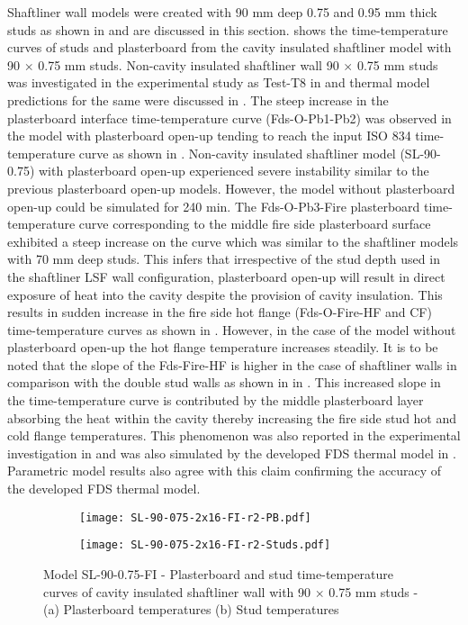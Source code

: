 Shaftliner wall models were created with 90 mm deep 0.75 and 0.95 mm thick studs as shown in  and are discussed in this section.  shows the time-temperature curves of studs and plasterboard from the cavity insulated shaftliner model with 90 $\times$ 0.75 mm studs. Non-cavity insulated shaftliner wall 90 $\times$ 0.75 mm studs was investigated in the experimental study as Test-T8 in  and thermal model predictions for the same were discussed in . The steep increase in the plasterboard interface time-temperature curve (Fds-O-Pb1-Pb2) was observed in the model with plasterboard open-up tending to reach the input ISO 834 time-temperature curve as shown in . Non-cavity insulated shaftliner model (SL-90-0.75) with plasterboard open-up experienced severe instability similar to the previous plasterboard open-up models. However, the model without plasterboard open-up could be simulated for 240 min. The Fds-O-Pb3-Fire plasterboard time-temperature curve corresponding to the middle fire side plasterboard surface exhibited a steep increase on the curve which was similar to the shaftliner models with 70 mm deep studs. This infers that irrespective of the stud depth used in the shaftliner LSF wall configuration, plasterboard open-up will result in direct exposure of heat into the cavity despite the provision of cavity insulation. This results in sudden increase in the fire side hot flange (Fds-O-Fire-HF and CF) time-temperature curves as shown in . However, in the case of the model without plasterboard open-up the hot flange temperature increases steadily. It is to be noted that the slope of the Fds-Fire-HF is higher in the case of shaftliner walls in comparison with the double stud walls as shown in  in . This increased slope in the time-temperature curve is contributed by the middle plasterboard layer absorbing the heat within the cavity thereby increasing the fire side stud hot and cold flange temperatures. This phenomenon was also reported in the experimental investigation in  and was also simulated by the developed FDS thermal model in . Parametric model results also agree with this claim confirming the accuracy of the developed FDS thermal model.  
\begin{figure}[!htbp]
	\centering
	\begin{subfigure}[b]{0.6\textwidth}
		\centering
		\texttt{[image: SL-90-075-2x16-FI-r2-PB.pdf]}
		\caption{}
		\label{subfig:SL-90-075-2x16-FI-r2-PB}
	\end{subfigure}
	\begin{subfigure}[b]{0.6\textwidth}
		\centering
		\texttt{[image: SL-90-075-2x16-FI-r2-Studs.pdf]}
		\caption{}
		\label{subfig:SL-90-075-2x16-FI-r2-Studs}
	\end{subfigure}
	   \caption{Model SL-90-0.75-FI - Plasterboard and stud time-temperature curves of cavity insulated shaftliner wall with 90 $\times$ 0.75 mm studs - (a) Plasterboard temperatures (b) Stud temperatures}
	   \label{fig:SL-90-075-2x16-FI-r2}
\end{figure}

